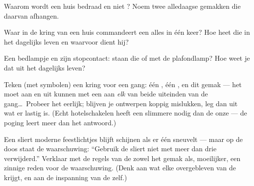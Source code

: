 \begin{exercise}[$\star$]\label{exo:g5:series-parallel-circuits:6}
Waarom wordt een huis  bedraad en niet ? Noem twee
alledaagse gemakken die daarvan afhangen.
\end{exercise}

\begin{exercise}[$\star$]\label{exo:g5:series-parallel-circuits:7}
Waar in de kring van een huis commandeert een  alles in één
keer? Hoe heet die  in het dagelijks leven en waarvoor dient
hij?
\end{exercise}

\begin{exercise}[$\star$]\label{exo:g5:series-parallel-circuits:8}
Een bedlampje en zijn stopcontact: staan die  of
 met de plafondlamp? Hoe weet je dat uit het dagelijks
leven?
\end{exercise}

\begin{exercise}[$\star\star$]\label{exo:g5:series-parallel-circuits:9}
Teken (met symbolen) een kring voor een gang: één , één
, en dit gemak --- het  moet aan en uit kunnen met een
 aan \emph{elk} van beide uiteinden van de gang\dots\ Probeer
het eerlijk; blijven je ontwerpen koppig mislukken, leg dan uit wat er
lastig is. (Echt hotelschakelen heeft een slimmere  nodig
dan de onze --- de poging leert meer dan het antwoord.)
\end{exercise}

\begin{exercise}[$\star\star$]\label{exo:g5:series-parallel-circuits:10}
Een sliert moderne feestlichtjes blijft schijnen als er één
 sneuvelt --- maar op de doos staat de waarschuwing: ``Gebruik
de sliert niet met meer dan drie  verwijderd.'' Verklaar met de
regels van de  zowel het gemak als, moeilijker, een zinnige
reden voor de waarschuwing. (Denk aan wat elke overgebleven
 van de  krijgt, en aan de inspanning van de
 zelf.)
\end{exercise}

